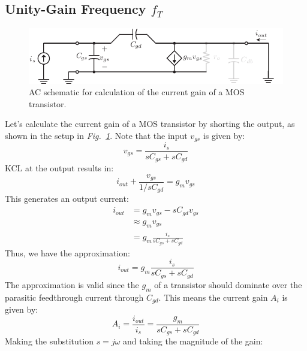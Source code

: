 \subsection{Unity-Gain Frequency \texorpdfstring{$f_T$}{}}
\begin{figure}[tb]
\centering
\includegraphics[scale=1]{hybrid_pi_ft}
\caption{AC schematic for calculation of the current gain of a MOS transistor.}
\label{fig:hybrid_pi_ft}
\end{figure}
Let's calculate the current gain of a MOS transistor by shorting the output, as shown in the setup in \emph{Fig.~\ref{fig:hybrid_pi_ft}}.  Note that the input $v_{gs}$ is given by:
    \begin{equation}
        {v_{gs}} = \frac{{{i_s}}}{{s{C_{gs}} + s{C_{gd}}}}
    \end{equation}
KCL at the output results in:
    \begin{equation} 
        {i_{out}} + \frac{{{v_{gs}}}}{{1/s{C_{gd}}}} = {g_m}{v_{gs}} 
    \end{equation}
This generates an output current:
    \begin{align*} 
        {i_{out}} &= {g_m}{v_{gs}} - s{C_{gd}}{v_{gs}}\\
        &\approx {g_m}{v_{gs}}\\
        &= {g_m}\frac{{{i_s}}}{{s{C_{gs}} + s{C_{gd}}}}
    \end{align*}
Thus, we have the approximation:
    \begin{equation} 
        i_{out} = {g_m}\frac{i_s}{s{C_{gs}} + s{C_{gd}}}
    \end{equation}
The approximation is valid since the $g_m$ of a transistor should dominate over the parasitic feedthrough current through $C_{gd}$.  This means the current gain $A_i$ is given by:
    \begin{equation} 
        {A_i} = \frac{{{i_{out}}}}{{{i_s}}} = \frac{{{g_m}}}{{s{C_{gs}} + s{C_{gd}}}} 
    \end{equation}
Making the substitution $s = j\omega$ and taking the magnitude of the gain:
